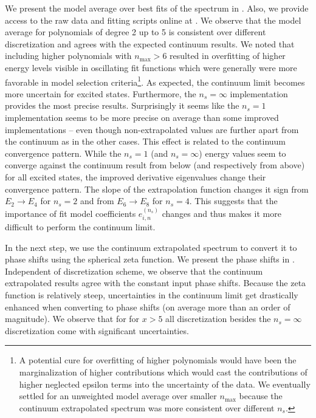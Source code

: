 We present the model average over best fits of the spectrum in .
Also, we provide access to the raw data and fitting scripts online at \cite{luescher-nd_201}.
We observe that the model average for polynomials of degree 2 up to 5 is consistent over different discretization and agrees with the expected continuum results.
We noted that including higher polynomials with $n_\mathrm{max} > 6$ resulted in overfitting of higher energy levels visible in oscillating fit functions which were generally were more favorable in model selection criteria\footnote{
    A potential cure for overfitting of higher polynomials would have been the marginalization of higher contributions which would cast the contributions of higher neglected epsilon terms into the uncertainty of the data.
    We eventually settled for an unweighted model average over smaller $n_\mathrm{max}$ because the continuum extrapolated spectrum was more consistent over different $n_s$.
}.
As expected, the continuum limit becomes more uncertain for excited states.
Furthermore, the $n_s = \infty$ implementation provides the most precise results.
Surprisingly it seems like the $n_s = 1$ implementation seems to be more precise on average than some improved implementations -- even though non-extrapolated values are further apart from the continuum as in the other cases.
This effect is related to the continuum convergence pattern.
While the $n_s = 1$ (and $n_s = \infty$) energy values seem to converge against the continuum result from below (and respectively from above) for all excited states, the improved derivative eigenvalues change their convergence pattern.
The slope of the extrapolation function changes it sign from $E_2 \to E_4$ for $n_s = 2$ and from $E_6 \to E_8$ for  $n_s = 4$.
This suggests that the importance of fit model coefficients $e_{i,n}^{(n_s)}$ changes and thus makes it more difficult to perform the continuum limit.

In the next step, we use the continuum extrapolated spectrum to convert it to phase shifts using the spherical zeta function.
We present the phase shifts in .
Independent of discretization scheme, we observe that the continuum extrapolated results agree with the constant input phase shifts.
Because the zeta function is relatively steep, uncertainties in the continuum limit get drastically enhanced when converting to phase shifts (on average more than an order of magnitude).
We observe that for for $x > 5$ all discretization besides the $n_s = \infty$ discretization come with significant uncertainties.


